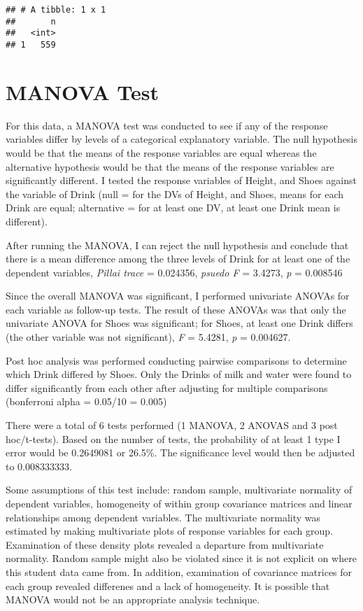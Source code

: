 \documentclass[]{article}
\begin{document}
\begin{verbatim}
## # A tibble: 1 x 1
##       n
##   <int>
## 1   559
\end{verbatim}

\hypertarget{manova-test}{%
\section{MANOVA Test}\label{manova-test}}

For this data, a MANOVA test was conducted to see if any of the response
variables differ by levels of a categorical explanatory variable. The
null hypothesis would be that the means of the response variables are
equal whereas the alternative hypothesis would be that the means of the
response variables are significantly different. I tested the response
variables of Height, and Shoes against the variable of Drink (null = for
the DVs of Height, and Shoes, means for each Drink are equal;
alternative = for at least one DV, at least one Drink mean is
different).

After running the MANOVA, I can reject the null hypothesis and conclude
that there is a mean difference among the three levels of Drink for at
least one of the dependent variables, \emph{Pillai trace} = 0.024356,
\emph{psuedo F} = 3.4273, \emph{p} = 0.008546

Since the overall MANOVA was significant, I performed univariate ANOVAs
for each variable as follow-up tests. The result of these ANOVAs was
that only the univariate ANOVA for Shoes was significant; for Shoes, at
least one Drink differs (the other variable was not significant),
\emph{F} = 5.4281, \emph{p} = 0.004627.

Post hoc analysis was performed conducting pairwise comparisons to
determine which Drink differed by Shoes. Only the Drinks of milk and
water were found to differ significantly from each other after adjusting
for multiple comparisons (bonferroni alpha = 0.05/10 = 0.005)

There were a total of 6 tests performed (1 MANOVA, 2 ANOVAS and 3 post
hoc/t-tests). Based on the number of tests, the probability of at least
1 type I error would be 0.2649081 or 26.5\%. The significance level
would then be adjusted to 0.008333333.

Some assumptions of this test include: random sample, multivariate
normality of dependent variables, homogeneity of within group covariance
matrices and linear relationships among dependent variables. The
multivariate normality was estimated by making multivariate plots of
response variables for each group. Examination of these density plots
revealed a departure from multivariate normality. Random sample might
also be violated since it is not explicit on where this student data
came from. In addition, examination of covariance matrices for each
group revealed differenes and a lack of homogeneity. It is possible that
MANOVA would not be an appropriate analysis technique.
\end{document}
